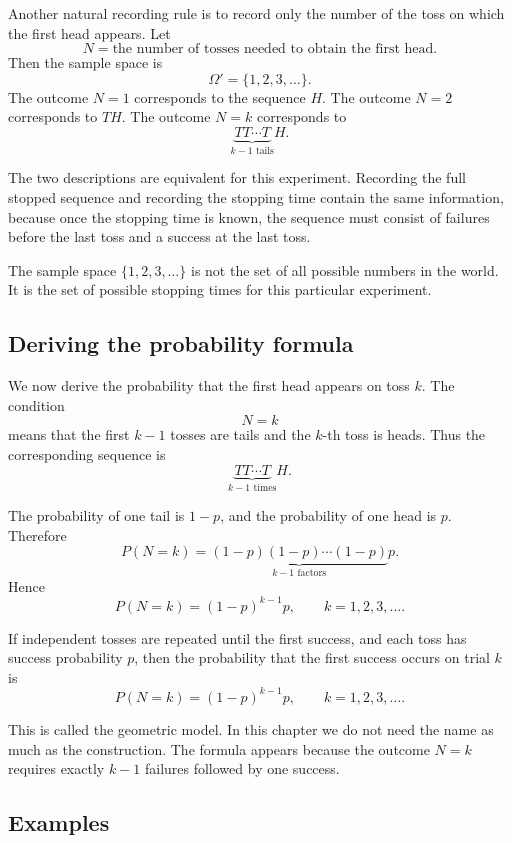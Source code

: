 Another natural recording rule is to record only the number of the toss on which
the first head appears. Let
\[
N=\text{the number of tosses needed to obtain the first head}.
\]
Then the sample space is
\[
\Omega' = \{1,2,3,\ldots\}.
\]
The outcome \(N=1\) corresponds to the sequence \(H\). The outcome \(N=2\)
corresponds to \(TH\). The outcome \(N=k\) corresponds to
\[
\underbrace{TT\cdots T}_{k-1\text{ tails}}H.
\]

The two descriptions are equivalent for this experiment. Recording the full
stopped sequence and recording the stopping time contain the same information,
because once the stopping time is known, the sequence must consist of failures
before the last toss and a success at the last toss.

\begin{remarkbox}
The sample space \(\{1,2,3,
\ldots\}\) is not the set of all possible numbers in the world. It is the set of
possible stopping times for this particular experiment.
\end{remarkbox}

\subsection*{Deriving the probability formula}

We now derive the probability that the first head appears on toss \(k\). The
condition
\[
N=k
\]
means that the first \(k-1\) tosses are tails and the \(k\)-th toss is heads.
Thus the corresponding sequence is
\[
\underbrace{TT\cdots T}_{k-1\text{ times}}H.
\]

The probability of one tail is \(1-p\), and the probability of one head is
\(p\). Therefore
\[
P(N=k)=\underbrace{(1-p)(1-p)\cdots(1-p)}_{k-1\text{ factors}}p.
\]
Hence
\[
P(N=k)=(1-p)^{k-1}p,\qquad k=1,2,3,\ldots.
\]

\begin{theorembox}
If independent tosses are repeated until the first success, and each toss has
success probability \(p\), then the probability that the first success occurs on
trial \(k\) is
\[
P(N=k)=(1-p)^{k-1}p,\qquad k=1,2,3,\ldots.
\]
\end{theorembox}

This is called the geometric model. In this chapter we do not need the name as
much as the construction. The formula appears because the outcome \(N=k\)
requires exactly \(k-1\) failures followed by one success.

\subsection*{Examples}

